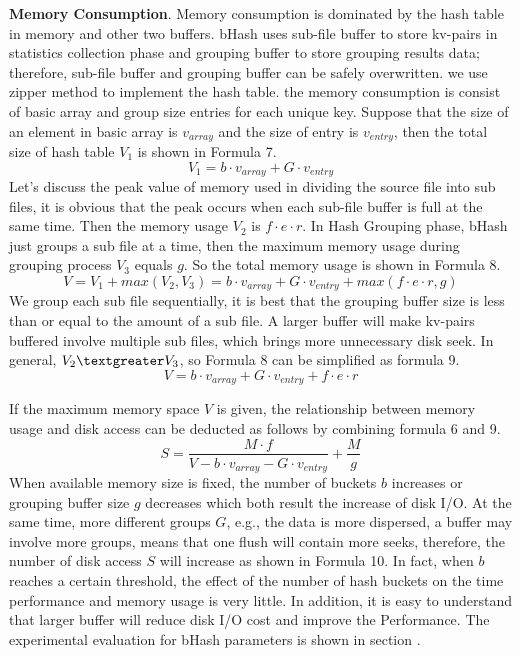 \textbf{Memory Consumption}. Memory consumption is dominated by the hash table in memory and other two buffers. bHash uses sub-file buffer to
 store kv-pairs in statistics collection phase and grouping buffer to store grouping results data; therefore, sub-file buffer and grouping buffer can be safely overwritten. we use zipper method to implement the hash table. the memory consumption is consist of basic array and group size entries for each unique key. Suppose that the size of an element in basic array is $v_{array}$ and the size of entry is $v_{entry}$, then the total size of hash table $V_1$ is shown in Formula 7.
 \begin{equation}\label{eq:numberofdata}
  V_1=b\cdot v_{array}+ G\cdot v_{entry}
\end{equation}
Let's discuss the peak value of memory used in dividing the source file into sub files, it is obvious that the peak occurs when each sub-file buffer is full at the same time. Then the memory usage $V_2$ is $f\cdot e\cdot r$. In Hash Grouping phase, bHash just groups a sub file at a time, then the maximum memory usage during grouping process $V_3$ equals $g$. So the total memory usage is shown in Formula 8.
\begin{equation}\label{eq:numberofdata}
  V=V_1+ max(V_2,V_3)=b\cdot v_{array}+ G\cdot v_{entry}+ max(f\cdot e\cdot r,g)
\end{equation}
We group each sub file sequentially, it is best that the grouping buffer size is less than or equal to the amount of a sub file. A larger buffer will make kv-pairs buffered involve multiple sub files, which brings more unnecessary disk seek. In general, $V_2\textgreater V_3$, so Formula 8 can be simplified as formula 9.
\begin{equation}\label{eq:numberofdata}
  V=b\cdot v_{array}+ G\cdot v_{entry}+ f\cdot e\cdot r
\end{equation}

 If the maximum memory space $V$ is given, the relationship between memory usage and disk access can be deducted as follows by combining formula 6 and 9.
 \begin{equation}\label{eq:numberofdata}
  S=\frac{M\cdot f}{V-b\cdot v_{array}- G\cdot v_{entry}}+\frac{M}{g}
\end{equation}
When available memory size is fixed, the number of buckets $b$ increases or grouping buffer size $g$ decreases which both result the increase of disk I/O. At the same time, more different groups $G$, e.g., the data is more dispersed, a buffer may involve more groups, means that one flush will contain more seeks, therefore, the number of disk access $S$ will increase as shown in Formula 10. In fact, when $b$ reaches a certain threshold, the effect of the number of hash buckets on the time performance and memory usage is very little. In addition, it is easy to understand that larger buffer will reduce disk I/O cost and improve the Performance. The experimental evaluation for bHash parameters is shown in section \uppercase\expandafter{}.

%
